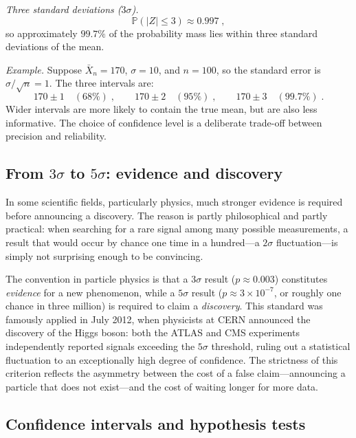 \medskip

\textit{Three standard deviations ($3\sigma$).}
\[
    \mathbb{P}(|Z| \leq 3) \approx 0.997 \; ,
\]
so approximately $99.7\%$ of the probability mass lies within three standard deviations of the mean.

\medskip

\textit{Example.} Suppose $\bar{X}_n = 170$, $\sigma = 10$, and $n = 100$, so the standard error is $\sigma/\sqrt{n} = 1$. The three intervals are:
\[
    170 \pm 1 \quad (68\%)\;, \qquad
    170 \pm 2 \quad (95\%)\;, \qquad
    170 \pm 3 \quad (99.7\%)\;.
\]
Wider intervals are more likely to contain the true mean, but are also less informative. The choice of confidence level is a deliberate trade-off between precision and reliability.

\subsection*{From \texorpdfstring{$3\sigma$}{3-sigma} to \texorpdfstring{$5\sigma$}{5-sigma}: evidence and discovery}

In some scientific fields, particularly physics, much stronger evidence is required before announcing a discovery. The reason is partly philosophical and partly practical: when searching for a rare signal among many possible measurements, a result that would occur by chance one time in a hundred---a $2\sigma$ fluctuation---is simply not surprising enough to be convincing.

\medskip

The convention in particle physics is that a $3\sigma$ result ($p \approx 0.003$) constitutes \textit{evidence} for a new phenomenon, while a $5\sigma$ result ($p \approx 3 \times 10^{-7}$, or roughly one chance in three million) is required to claim a \textit{discovery}. This standard was famously applied in July 2012, when physicists at CERN announced the discovery of the Higgs boson: both the ATLAS and CMS experiments independently reported signals exceeding the $5\sigma$ threshold, ruling out a statistical fluctuation to an exceptionally high degree of confidence. The strictness of this criterion reflects the asymmetry between the cost of a false claim---announcing a particle that does not exist---and the cost of waiting longer for more data.

\subsection*{Confidence intervals and hypothesis tests}

